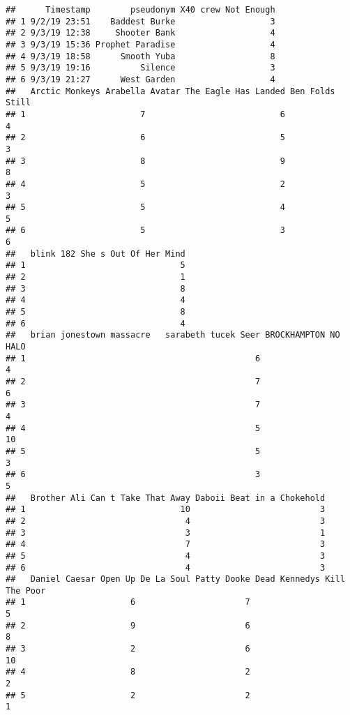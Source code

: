 \documentclass[]{article}
\begin{document}
\begin{verbatim}
##      Timestamp        pseudonym X40 crew Not Enough
## 1 9/2/19 23:51    Baddest Burke                   3
## 2 9/3/19 12:38     Shooter Bank                   4
## 3 9/3/19 15:36 Prophet Paradise                   4
## 4 9/3/19 18:58      Smooth Yuba                   8
## 5 9/3/19 19:16          Silence                   3
## 6 9/3/19 21:27      West Garden                   4
##   Arctic Monkeys Arabella Avatar The Eagle Has Landed Ben Folds Still
## 1                       7                           6               4
## 2                       6                           5               3
## 3                       8                           9               8
## 4                       5                           2               3
## 5                       5                           4               5
## 6                       5                           3               6
##   blink 182 She s Out Of Her Mind
## 1                               5
## 2                               1
## 3                               8
## 4                               4
## 5                               8
## 6                               4
##   brian jonestown massacre   sarabeth tucek Seer BROCKHAMPTON NO HALO
## 1                                              6                    4
## 2                                              7                    6
## 3                                              7                    4
## 4                                              5                   10
## 5                                              5                    3
## 6                                              3                    5
##   Brother Ali Can t Take That Away Daboii Beat in a Chokehold
## 1                               10                          3
## 2                                4                          3
## 3                                3                          1
## 4                                7                          3
## 5                                4                          3
## 6                                4                          3
##   Daniel Caesar Open Up De La Soul Patty Dooke Dead Kennedys Kill The Poor
## 1                     6                      7                           5
## 2                     9                      6                           8
## 3                     2                      6                          10
## 4                     8                      2                           2
## 5                     2                      2                           1

\end{verbatim}
\end{document}
